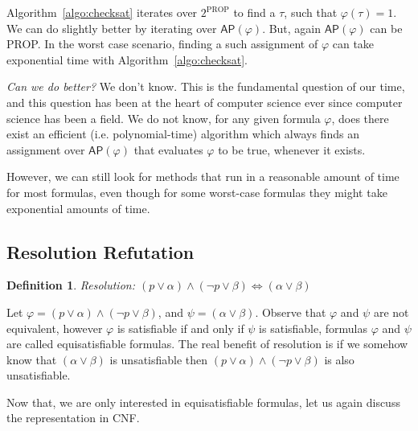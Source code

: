 \documentclass{article}
\newtheorem{definition}[theorem]{Definition}
\newcommand{\ap}[1]{\ensuremath{\mathsf{AP}{#1}}}
\begin{document}
 \begin{algorithm}[H]

 	\caption{CheckSAT{($\varphi$)}\label{algo:checksat}}
 	\begin{algorithmic}[1]
 		\label{line:checksat:prop}
		 		\State

	 		\EndIf
 		\EndFor
 		\State
 	\end{algorithmic}
 \end{algorithm}
Algorithm~\ref{algo:checksat} iterates over $2^{\text{PROP}}$ to find a $\tau$, such that $\varphi(\tau)=1$. We can do slightly better by iterating over $\ap{(\varphi)}$. But, again $\ap{(\varphi)}$ can be PROP. In the worst case scenario, finding a such assignment of $\varphi$ can take exponential time with Algorithm~\ref{algo:checksat}.

\emph{Can we do better?} We don't know.
This is the fundamental question of our time, and this question has been at the heart of computer science ever since computer science has been a field.
We do not know, for any given formula $\varphi$, does there exist an efficient (i.e. polynomial-time) algorithm which always finds an assignment
over $\ap{(\varphi)}$ that evaluates $\varphi$ to be true, whenever it exists.

However, we can still look for methods that run in a reasonable amount of time for most formulas, even though for some worst-case formulas they might take exponential amounts of time.

\subsection{Resolution Refutation}
\begin{definition}
Resolution:  $(p \lor \alpha)\land (\lnot p \lor \beta) \iff (\alpha \lor \beta)$
\end{definition}
Let $\varphi = (p \lor \alpha)\land (\lnot p \lor \beta)$, and $\psi = (\alpha \lor \beta)$. Observe that $\varphi$ and $\psi$ are not equivalent, however $\varphi$ is satisfiable if and only if $\psi$ is satisfiable, formulas $\varphi$ and $\psi$ are called equisatisfiable formulas. The real benefit of resolution is if we somehow know that $(\alpha \lor \beta)$ is unsatisfiable then $(p \lor \alpha)\land (\lnot p \lor \beta)$ is also unsatisfiable.

Now that, we are only interested in equisatisfiable formulas, let us again discuss the representation in CNF.
\end{document}
